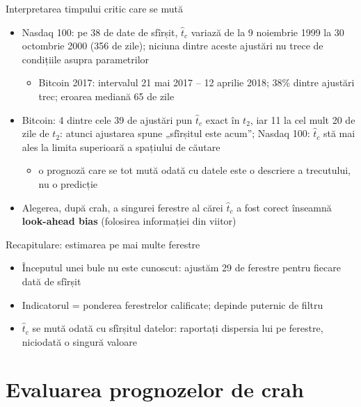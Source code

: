 \begin{frame}{Interpretarea timpului critic care se mută}
\itemsize{\small}
\begin{itemize}
    \item Nasdaq 100: pe 38 de date de sfîrșit, $\hat t_c$ variază de la 9 noiembrie 1999 la 30 octombrie 2000 (356 de zile); niciuna dintre aceste ajustări nu trece de condițiile asupra parametrilor
    \begin{itemize}
        \item Bitcoin 2017: intervalul 21 mai 2017 -- 12 aprilie 2018; 38\% dintre ajustări trec; eroarea mediană 65 de zile
    \end{itemize}
    \item Bitcoin: 4 dintre cele 39 de ajustări pun $\hat t_c$ exact în $t_2$, iar 11 la cel mult 20 de zile de $t_2$: atunci ajustarea spune „sfîrșitul este acum”; Nasdaq 100: $\hat t_c$ stă mai ales la limita superioară a spațiului de căutare
    \begin{itemize}
        \item o prognoză care se tot mută odată cu datele este o descriere a trecutului, nu o predicție
    \end{itemize}
    \item Alegerea, după crah, a singurei ferestre al cărei $\hat t_c$ a fost corect înseamnă \textbf{look-ahead bias} (folosirea informației din viitor)
\end{itemize}
\end{frame}

\begin{frame}{Recapitulare: estimarea pe mai multe ferestre}
\itemsize{\small}
\begin{itemize}
    \item Începutul unei bule nu este cunoscut: ajustăm 29 de ferestre pentru fiecare dată de sfîrșit
    \item Indicatorul = ponderea ferestrelor calificate; depinde puternic de filtru
    \item $\hat t_c$ se mută odată cu sfîrșitul datelor: raportați dispersia lui pe ferestre, niciodată o singură valoare
\end{itemize}
\end{frame}


\section{Evaluarea prognozelor de crah}

